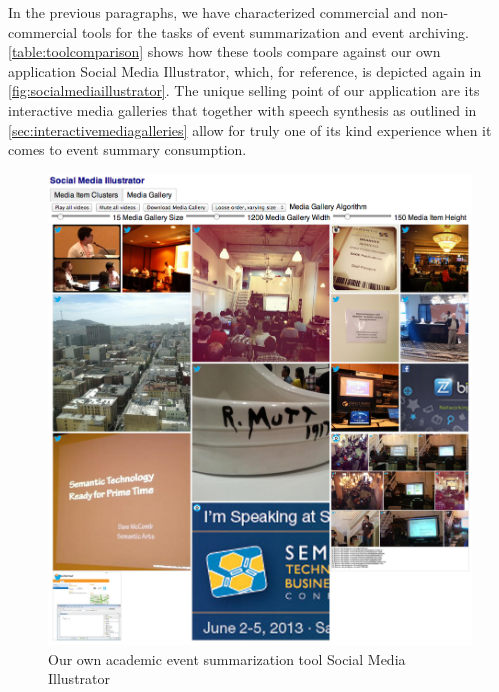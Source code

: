 In the previous paragraphs, we have characterized
commercial and non-commercial tools for the tasks
of event summarization and event archiving. 
\autoref{table:toolcomparison} shows how these tools
compare against our own application Social Media Illustrator,
which, for reference, is depicted again in \autoref{fig:socialmediaillustrator}.
The unique selling point of our application
are its interactive media galleries that together with speech synthesis
as outlined in \autoref{sec:interactivemediagalleries}
allow for truly one of its kind experience when it comes to 
event summary consumption.

\begin{figure}
  \centering
  \includegraphics[width=\linewidth]{socialmediaillustrator.png}
  \caption{Our own academic event summarization tool Social Media Illustrator}
  \label{fig:socialmediaillustrator}
\end{figure}

